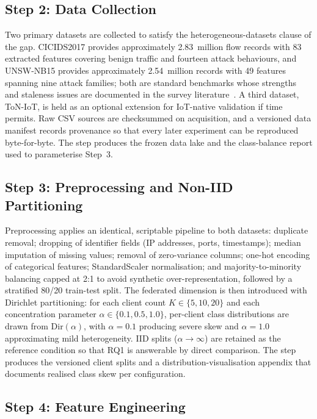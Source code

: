 \documentclass[11pt,a4paper]{article}
\begin{document}
\subsection{Step 2: Data Collection}\label{sec:step2}

Two primary datasets are collected to satisfy the heterogeneous-datasets
clause of the gap. CICIDS2017 provides approximately 2.83~million flow
records with 83 extracted features covering benign traffic and fourteen
attack behaviours, and UNSW-NB15 provides approximately 2.54~million
records with 49 features spanning nine attack families; both are standard
benchmarks whose strengths and staleness issues are documented in the
survey literature~\cite{hozouri2025,diana2025}. A third dataset, ToN-IoT,
is held as an optional extension for IoT-native validation if time
permits. Raw CSV sources are checksummed on acquisition, and a versioned
data manifest records provenance so that every later experiment can be
reproduced byte-for-byte. The step produces the frozen data lake and the
class-balance report used to parameterise Step~3.

\subsection{Step 3: Preprocessing and Non-IID Partitioning}\label{sec:step3}

Preprocessing applies an identical, scriptable pipeline to both datasets:
duplicate removal; dropping of identifier fields (IP addresses, ports,
timestamps); median imputation of missing values; removal of zero-variance
columns; one-hot encoding of categorical features; StandardScaler
normalisation; and majority-to-minority balancing capped at 2:1 to avoid
synthetic over-representation, followed by a stratified 80/20 train-test
split. The federated dimension is then introduced with Dirichlet
partitioning: for each client count $K \in \{5, 10, 20\}$ and each
concentration parameter $\alpha \in \{0.1, 0.5, 1.0\}$, per-client class
distributions are drawn from $\mathrm{Dir}(\alpha)$, with $\alpha = 0.1$
producing severe skew and $\alpha = 1.0$ approximating mild heterogeneity.
IID splits ($\alpha \to \infty$) are retained as the reference condition
so that RQ1 is answerable by direct comparison. The step produces the
versioned client splits and a distribution-visualisation appendix that
documents realised class skew per configuration.

\subsection{Step 4: Feature Engineering}\label{sec:step4}
\end{document}
